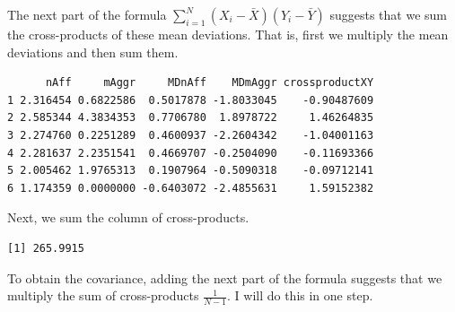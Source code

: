 \documentclass[
  11pt,
]{book}
\newenvironment{Shaded}{\begin{snugshade}}{\end{snugshade}}
\newcommand{\CommentTok}[1]{\textcolor[rgb]{0.56,0.35,0.01}{\textit{#1}}}
\newcommand{\DecValTok}[1]{\textcolor[rgb]{0.00,0.00,0.81}{#1}}
\newcommand{\FunctionTok}[1]{\textcolor[rgb]{0.00,0.00,0.00}{#1}}
\newcommand{\NormalTok}[1]{#1}
\newcommand{\OtherTok}[1]{\textcolor[rgb]{0.56,0.35,0.01}{#1}}
\newcommand{\SpecialCharTok}[1]{\textcolor[rgb]{0.00,0.00,0.00}{#1}}
\begin{document}
The next part of the formula \(\sum_{i=1}^N \left( X_i - \bar{X} \right) \left( Y_i - \bar{Y} \right)\) suggests that we sum the cross-products of these mean deviations. That is, first we multiply the mean deviations and then sum them.

\begin{Shaded}
\end{Shaded}

\begin{verbatim}
      nAff     mAggr     MDnAff    MDmAggr crossproductXY
1 2.316454 0.6822586  0.5017878 -1.8033045    -0.90487609
2 2.585344 4.3834353  0.7706780  1.8978722     1.46264835
3 2.274760 0.2251289  0.4600937 -2.2604342    -1.04001163
4 2.281637 2.2351541  0.4669707 -0.2504090    -0.11693366
5 2.005462 1.9765313  0.1907964 -0.5090318    -0.09712141
6 1.174359 0.0000000 -0.6403072 -2.4855631     1.59152382
\end{verbatim}

Next, we sum the column of cross-products.

\begin{Shaded}
\end{Shaded}

\begin{verbatim}
[1] 265.9915
\end{verbatim}

To obtain the covariance, adding the next part of the formula suggests that we multiply the sum of cross-products \(\frac{1}{N-1}\). I will do this in one step.

\begin{Shaded}
\end{Shaded}
\end{document}

